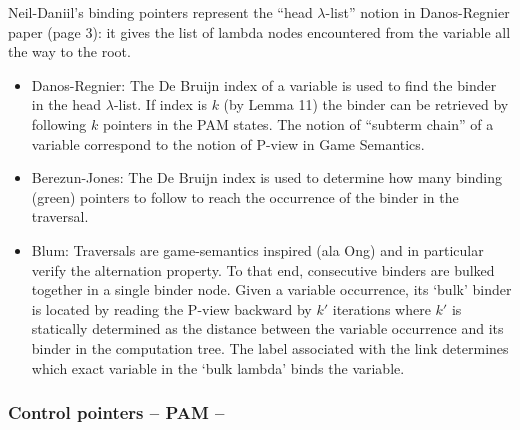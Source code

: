 \documentclass{article}
\theoremstyle{definition}
\begin{document}
Neil-Daniil's binding pointers represent the ``head $\lambda$-list'' notion in Danos-Regnier paper (page 3): it gives the list of lambda nodes encountered from the variable all the way to the root.

\begin{itemize}
\item Danos-Regnier: The De Bruijn index of a variable is used to find the binder in the head $\lambda$-list. If index is $k$ (by Lemma 11) the binder can be retrieved by following $k$ pointers in the PAM states. The notion of ``subterm chain'' of a variable correspond to the notion of P-view in Game Semantics.

\item  Berezun-Jones: The De Bruijn index is used to determine how many binding (green) pointers to follow to reach the occurrence of the binder in the traversal.

\item Blum: Traversals are game-semantics inspired (ala Ong) and in particular verify the alternation property. To that end, consecutive binders are bulked together in a single binder node. Given a variable occurrence, its `bulk' binder is located by reading the P-view backward by $k'$ iterations where $k'$ is statically determined as the distance between the variable occurrence and its binder in the computation tree. The label associated with the link determines which exact variable in the `bulk lambda' binds the variable.
\end{itemize}

\subsubsection{Control pointers -- PAM -- }
\end{document}
